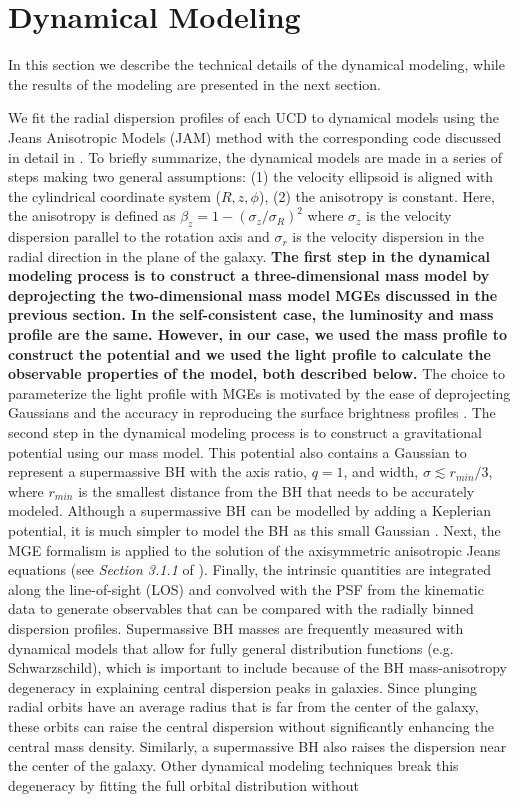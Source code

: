 \documentclass{aastex}
\begin{document}
  

\section{Dynamical Modeling} \label{sec:dynamical}

In this section we describe the technical details of the dynamical modeling, while the results of the modeling are presented in the next section.

We fit the radial dispersion profiles of each UCD to dynamical models using the Jeans Anisotropic Models (JAM) method with the corresponding code discussed in detail in \citet{cappellari08}. To briefly summarize, the dynamical models are made in a series of steps making two general assumptions: (1) the velocity ellipsoid is aligned with the cylindrical coordinate system ($R,z,\phi$), (2) the anisotropy is constant. Here, the anisotropy is defined as $\beta_z = 1-(\sigma_z/\sigma_R)^2$ where $\sigma_z$ is the velocity dispersion parallel to the rotation axis and $\sigma_r$ is the velocity dispersion in the radial direction in the plane of the galaxy. \textbf{The first step in the dynamical modeling process is to construct a three-dimensional mass model by deprojecting the two-dimensional mass model MGEs discussed in the previous section. In the self-consistent case, the luminosity and mass profile are the same. However, in our case, we used the mass profile to construct the potential and we used the light profile to calculate the observable properties of the model, both described below.} The choice to parameterize the light profile with MGEs is motivated by the ease of deprojecting Gaussians and the accuracy in reproducing the surface brightness profiles \citep{emsellem94,cappellari02}. The second step in the dynamical modeling process is to construct a gravitational potential using our mass model. This potential also contains a Gaussian to represent a supermassive BH with the axis ratio, $q=1$, and width, $\sigma \lesssim r_{min}/3$, where $r_{min}$ is the smallest distance from the BH that needs to be accurately modeled. Although a supermassive BH can be modelled by adding a Keplerian potential, it is much simpler to model the BH as this small Gaussian \citep{emsellem94}. Next, the MGE formalism is applied to the solution of the axisymmetric anisotropic Jeans equations (see \textit{Section 3.1.1} of \citealt{cappellari08}). Finally, the intrinsic quantities are integrated along the line-of-sight (LOS) and convolved with the PSF from the kinematic data to generate observables that can be compared with the radially binned dispersion profiles. Supermassive BH masses are frequently measured with dynamical models that allow for fully general distribution functions (e.g. Schwarzschild), which is important to include because of the BH mass-anisotropy degeneracy in explaining central dispersion peaks in galaxies. Since plunging radial orbits have an average radius that is far from the center of the galaxy, these orbits can raise the central dispersion without significantly enhancing the central mass density. Similarly, a supermassive BH also raises the dispersion near the center of the galaxy. Other dynamical modeling techniques break this degeneracy by fitting the full orbital distribution without 
\end{document}
